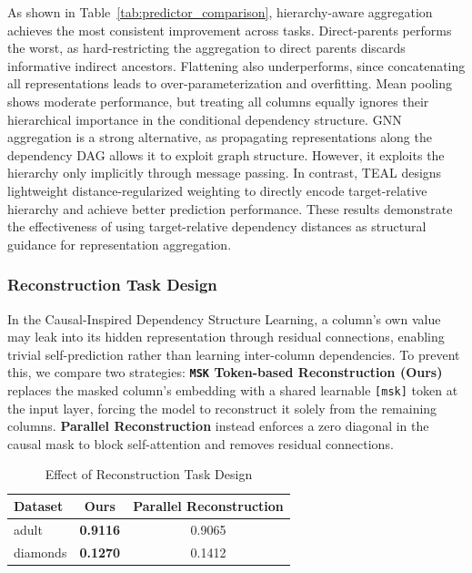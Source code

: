 \documentclass[conference]{IEEEtran}
\newcommand{\rln}[1]{{\color{black}#1}}
\newcommand{\syadd}[1]{{\color{black}#1}}
\newcommand{\syne}[1]{{\color{black}#1}}
\newcommand{\vldb}[1]{{\color{black}#1}}
\newcommand{\zjic}[1]{{\color{black}#1}}
\newcommand{\syic}[1]{{\color{black}#1}}
\newcommand{\syone}[1]{{\color{black}#1}}
\newcommand*{\ourmodel}{TEAL}
\begin{document}
\syadd{As shown in Table~\ref{tab:predictor_comparison}, hierarchy-aware aggregation achieves the most consistent improvement across tasks.} \syic{Direct-parents performs the worst, as hard-restricting the aggregation to direct parents discards informative indirect ancestors. Flattening also underperforms, since concatenating all representations leads to over-parameterization and overfitting.} \rln{Mean pooling shows moderate performance, but treating all columns equally ignores their hierarchical importance in the conditional dependency structure. \syic{GNN aggregation is a strong alternative, as propagating representations along the dependency DAG allows it to exploit graph structure. 
\zjic{
However, it exploits the hierarchy only implicitly through message passing.
}
In contrast, \ourmodel{} designs lightweight distance-regularized weighting to directly encode target-relative hierarchy
and achieve better prediction performance.} 
\syic{These results demonstrate the effectiveness of using target-relative dependency distances as structural guidance for representation aggregation.}
}

\subsubsection{Reconstruction Task Design}

\vldb{
In the \syic{Causal-Inspired Dependency Structure Learning}, a column's own value may leak into its hidden representation through residual connections, enabling trivial self-prediction rather than learning inter-column \syic{dependencies}. To prevent this, we compare two strategies: \textbf{\texttt{MSK} Token-based Reconstruction (Ours)} replaces the \syone{masked} column's embedding with a shared learnable \texttt{[msk]} token at the input layer, forcing the model to reconstruct it solely from the remaining columns. \textbf{Parallel Reconstruction} instead enforces a zero diagonal in the causal mask to block self-attention and removes residual connections.
}

\begin{table}[h]
    \centering
    \caption{Effect of Reconstruction Task Design}
    \label{tab:reconstruction_comparison}
    \footnotesize
    \setlength{\tabcolsep}{1.7pt}
    \begin{tabular}{lcc}
        \toprule
        Dataset & Ours & Parallel Reconstruction \\
        \midrule
        adult   & \syne{\textbf{0.9116}} & \syne{0.9065} \\
        diamonds & \syic{\textbf{0.1270}} & \syne{0.1412} \\
        \bottomrule
    \end{tabular}
\end{table}
\end{document}
